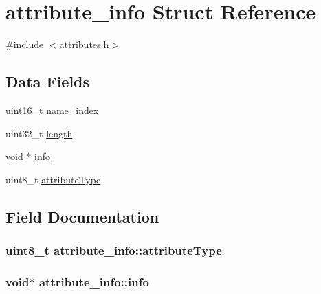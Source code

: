 \hypertarget{structattribute__info}{}\section{attribute\+\_\+info Struct Reference}
\label{structattribute__info}


{\ttfamily \#include $<$attributes.\+h$>$}

\subsection*{Data Fields}
\begin{DoxyCompactItemize}
\item 
uint16\+\_\+t \hyperlink{structattribute__info_a7e925cf3d7a72731f1b6a6e4d1c24cc2}{name\+\_\+index}
\item 
uint32\+\_\+t \hyperlink{structattribute__info_a9528b298d46309f571f1f58c84cbd57c}{length}
\item 
void $\ast$ \hyperlink{structattribute__info_a7f168925308e418b7b44c9f11fdf42ae}{info}
\item 
uint8\+\_\+t \hyperlink{structattribute__info_aba7285ff2ef220420c41b51470921544}{attribute\+Type}
\end{DoxyCompactItemize}


\subsection{Field Documentation}
\subsubsection[{\texorpdfstring{attribute\+Type}{attributeType}}]{\setlength{\rightskip}{0pt plus 5cm}uint8\+\_\+t attribute\+\_\+info\+::attribute\+Type}\hypertarget{structattribute__info_aba7285ff2ef220420c41b51470921544}{}\label{structattribute__info_aba7285ff2ef220420c41b51470921544}
\subsubsection[{\texorpdfstring{info}{info}}]{\setlength{\rightskip}{0pt plus 5cm}void$\ast$ attribute\+\_\+info\+::info}\hypertarget{structattribute__info_a7f168925308e418b7b44c9f11fdf42ae}{}\label{structattribute__info_a7f168925308e418b7b44c9f11fdf42ae}

